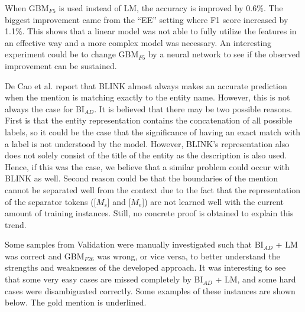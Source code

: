 \documentclass{report}
\theoremstyle{definition}
\theoremstyle{remark}
\begin{document}
When GBM$_{F5}$ is used instead of LM, the accuracy is improved by 0.6\%. The biggest improvement came from the ``EE'' setting where F1 score increased by 1.1\%. This shows that a linear model was not able to fully utilize the features in an effective way and a more complex model was necessary. An interesting experiment could be to change GBM$_{F5}$ by a neural network to see if the observed improvement can be sustained.

De Cao et al. \cite{GENRE} report that BLINK almost always makes an accurate prediction when the mention is matching exactly to the entity name. However, this is not always the case for BI$_{AD}$. It is believed that there may be two possible reasons. First is that the entity representation contains the concatenation of all possible labels, so it could be the case that the significance of having an exact match with a label is not understood by the model. However, BLINK's representation also does not solely consist of the title of the entity as the description is also used. Hence, if this was the case, we believe that a similar problem could occur with BLINK as well. Second reason could be that the boundaries of the mention cannot be separated well from the context due to the fact that the representation of the separator tokens ([$M_s$] and [$M_e$]) are not learned well with the current amount of training instances. Still, no concrete proof is obtained to explain this trend.

Some samples from Validation were manually investigated such that BI$_{AD}$ + LM was correct and GBM$_{F26}$ was wrong, or vice versa, to better understand the strengths and weaknesses of the developed approach. It was interesting to see that some very easy cases are missed completely by BI$_{AD}$ + LM, and some hard cases were disambiguated correctly. Some examples of these instances are shown below. The gold mention is underlined.

\begin{center}
\end{center}
\end{document}

